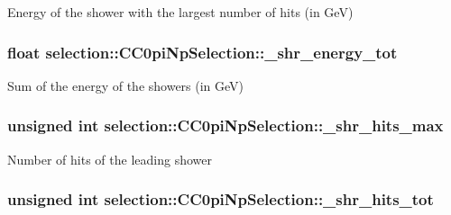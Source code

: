 Energy of the shower with the largest number of hits (in Ge\-V) \hypertarget{classselection_1_1CC0piNpSelection_a6e42f011e79f646f36df7148907d1b59}{
\subsubsection[{\-\_\-shr\-\_\-energy\-\_\-tot}]{\setlength{\rightskip}{0pt plus 5cm}float selection\-::\-C\-C0pi\-Np\-Selection\-::\-\_\-shr\-\_\-energy\-\_\-tot\hspace{0.3cm}{\ttfamily [private]}}}\label{classselection_1_1CC0piNpSelection_a6e42f011e79f646f36df7148907d1b59}
Sum of the energy of the showers (in Ge\-V) \hypertarget{classselection_1_1CC0piNpSelection_a750834ef52299d85f9596bbbafa1dffb}{
\subsubsection[{\-\_\-shr\-\_\-hits\-\_\-max}]{\setlength{\rightskip}{0pt plus 5cm}unsigned int selection\-::\-C\-C0pi\-Np\-Selection\-::\-\_\-shr\-\_\-hits\-\_\-max\hspace{0.3cm}{\ttfamily [private]}}}\label{classselection_1_1CC0piNpSelection_a750834ef52299d85f9596bbbafa1dffb}
Number of hits of the leading shower \hypertarget{classselection_1_1CC0piNpSelection_aa6e7162371e3e343df001f0afc8a20b8}{
\subsubsection[{\-\_\-shr\-\_\-hits\-\_\-tot}]{\setlength{\rightskip}{0pt plus 5cm}unsigned int selection\-::\-C\-C0pi\-Np\-Selection\-::\-\_\-shr\-\_\-hits\-\_\-tot\hspace{0.3cm}{\ttfamily [private]}}}\label{classselection_1_1CC0piNpSelection_aa6e7162371e3e343df001f0afc8a20b8}
